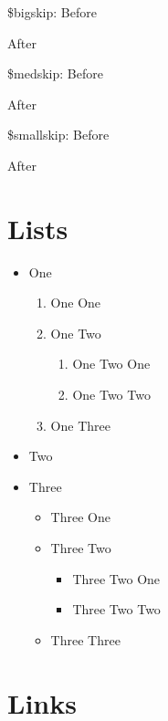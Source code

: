 \documentclass[ebook,demo]{pyscribe}
\begin{document}
\par\$bigskip: Before\par \bigskip After
\par\$medskip: Before\par \medskip After
\par\$smallskip: Before\par \medskip After

\section{Lists}

\par\begin{itemize}
\item One
\par\begin{enumerate}
\item One One
\item One Two
\par\begin{enumerate}
\item One Two One
\item One Two Two
\end{enumerate}\par
\item One Three
\end{enumerate}\par
\item Two
\item Three
\par\begin{itemize}
\item Three One
\item Three Two
\par\begin{itemize}
\item Three Two One
\item Three Two Two
\end{itemize}\par
\item Three Three
\end{itemize}\par
\end{itemize}\par

\section{Links}
\end{document}
